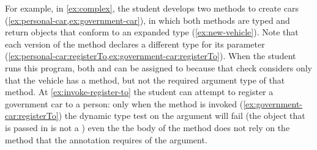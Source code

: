 For example, in \cref{ex:complex}, the student
develops two methods to create cars 
(\cref{ex:personal-car,ex:government-car}),
in which both methods are typed and return objects that conform to
an expanded  type (\cref{ex:new-vehicle}).
Note that each version of the  method
declares a different type for its parameter
(\cref{ex:personal-car:registerTo,ex:government-car:registerTo}).
When the student runs this program, both  and
 can be assigned to  because that
check considers only that the vehicle has a  method,
but not the required argument type of that method.
At \cref{ex:invoke-register-to} the student can attempt to register a
government car to a person: only when the method is invoked
(\cref{ex:government-car:registerTo}) the dynamic type test on the
argument will fail (the object that is passed in is not a
) even the the body of the  method
does not rely on the  method that the 
annotation requires of the argument.




